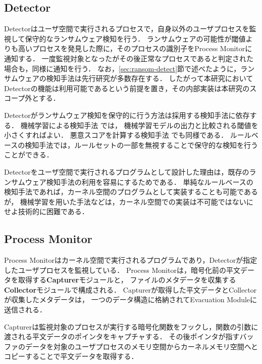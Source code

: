 \subsection{Detector}
Detectorはユーザ空間で実行されるプロセスで，自身以外のユーザプロセスを監視して保守的なランサムウェア検知を行う．
ランサムウェアの可能性が閾値よりも高いプロセスを発見した際に，そのプロセスの識別子をProcess Monitorに通知する．
一度監視対象となったがその後正常なプロセスであると判定された場合も，同様に通知を行う．
なお，\ref{sec:ransom-detect}節で述べたように，ランサムウェアの検知手法は先行研究が多数存在する．
したがって本研究においてDetectorの機能は利用可能であるという前提を置き，その内部実装は本研究のスコープ外とする．

Detectorがランサムウェア検知を保守的に行う方法は採用する検知手法に依存する．
機械学習による検知手法 \cite{alraizza2023ransomware,matos2018rockfs,wan2018feature}では，
機械学習モデルの出力と比較される閾値を小さくすればよい．
悪意スコアを計算する検知手法 \cite{kharraz2017redemption} でも同様である．
ルールベースの検知手法では，ルールセットの一部を無視することで保守的な検知を行うことができる．

Detectorをユーザ空間で実行されるプログラムとして設計した理由は，既存のランサムウェア検知手法の利用を容易にするためである．
単純なルールベースの検知手法であれば，カーネル空間のプログラムとして実装することも可能であるが，
機械学習を用いた手法などは，カーネル空間での実装は不可能ではないにせよ技術的に困難である．

\subsection{Process Monitor}
Process Monitorはカーネル空間で実行されるプログラムであり，Detectorが指定したユーザプロセスを監視している．
Process Monitorは，暗号化前の平文データを取得する\textbf{Capturer}モジュールと，
ファイルのメタデータを収集する\textbf{Collector}モジュールで構成される．
Capturerが取得した平文データとCollectorが収集したメタデータは，
一つのデータ構造に格納されてEvacuation Moduleに送信される．

Capturerは監視対象のプロセスが実行する暗号化関数をフックし，関数の引数に渡される平文データのポインタをキャプチャする．
その後ポインタが指すバッファのデータを対象のユーザプロセスのメモリ空間からカーネルメモリ空間へとコピーすることで平文データを取得する．

